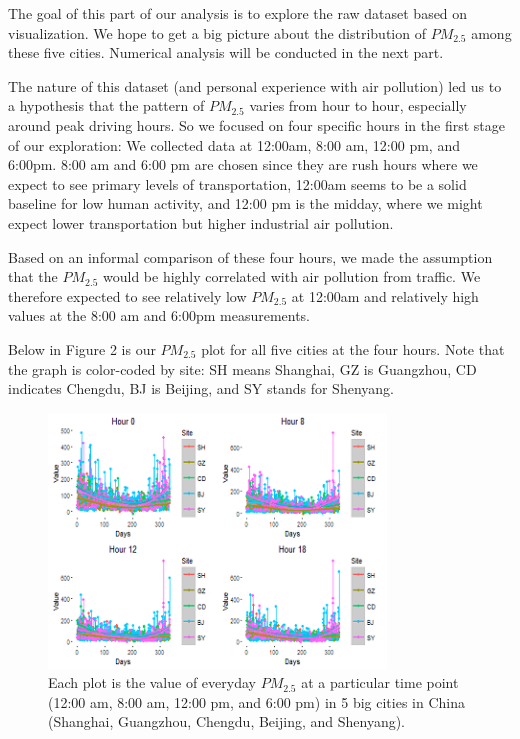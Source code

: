 \documentclass[11pt]{article} %
\begin{document}
	The goal of this part of our analysis is to explore the raw dataset based on visualization. We hope to get a big picture about the distribution of  \(PM_{2.5}\) among these five cities. Numerical analysis will be conducted in the next part.

	The nature of this dataset (and personal experience with air pollution) led us to a hypothesis that the pattern of \(PM_{2.5}\) varies from hour to hour, especially around peak driving hours. So we focused on four specific hours in the first stage of our exploration: We collected data at 12:00am, 8:00 am, 12:00 pm, and 6:00pm. 8:00 am and 6:00 pm are chosen since they are rush hours where we expect to see primary levels of transportation, 12:00am seems to be a solid baseline for low human activity, and 12:00 pm is the midday, where we might expect lower transportation but higher industrial air pollution.

	Based on an informal comparison of these four hours, we made the assumption that the \(PM_{2.5}\) would be highly correlated with air pollution from traffic. We therefore expected to see relatively low \(PM_{2.5}\) at 12:00am and relatively high values at the 8:00 am and 6:00pm measurements.

	Below in Figure 2 is our  \(PM_{2.5}\) plot for all five cities at the four hours. Note that the graph is color-coded by site: SH means Shanghai, GZ is Guangzhou, CD indicates Chengdu, BJ is Beijing, and SY stands for Shenyang. 
	
\begin{figure}[!ht]
  \centering
    \includegraphics[width=0.8\textwidth]{Figure1-1}
      \caption{Each plot is the value of everyday \(PM_{2.5}\) at a particular time point (12:00 am, 8:00 am, 12:00 pm, and 6:00 pm) in 5 big cities in China (Shanghai, Guangzhou, Chengdu, Beijing, and Shenyang).
}
\end{figure}
\end{document}
